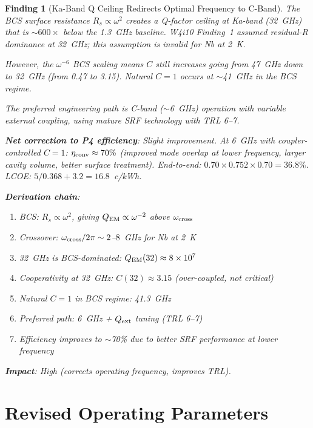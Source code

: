 \documentclass[11pt]{article}
\newtheorem{finding}{Finding}
\newcommand{\ee}[1]{\times 10^{#1}}
\newcommand{\QEM}{Q_{\rm EM}}
\begin{document}
\begin{finding}[Ka-Band Q Ceiling Redirects Optimal Frequency to C-Band]
\label{find:Q-ceiling}
The BCS surface resistance $R_s \propto \omega^2$ creates a Q-factor ceiling
at Ka-band (32~GHz) that is $\sim 600\times$ below the 1.3~GHz baseline.
W4i10 Finding~1 assumed residual-R dominance at 32~GHz; this assumption is
invalid for Nb at 2~K.

However, the $\omega^{-6}$ BCS scaling means $C$ still \emph{increases}
going from 47~GHz down to 32~GHz (from 0.47 to 3.15). Natural $C = 1$
occurs at $\sim$41~GHz in the BCS regime.

The preferred engineering path is C-band ($\sim$6~GHz) operation with
variable external coupling, using mature SRF technology with TRL 6--7.

\textbf{Net correction to P4 efficiency}: Slight \emph{improvement}.
At 6~GHz with coupler-controlled $C = 1$: $\eta_{\rm conv} \approx 70\%$
(improved mode overlap at lower frequency, larger cavity volume, better
surface treatment). End-to-end: $0.70 \times 0.752 \times 0.70 = 36.8\%$.
LCOE: $5/0.368 + 3.2 = 16.8$~c/kWh.

\textbf{Derivation chain}:
\begin{enumerate}[nosep]
\item BCS: $R_s \propto \omega^2$, giving $\QEM \propto \omega^{-2}$ above
  $\omega_{\rm cross}$
\item Crossover: $\omega_{\rm cross}/2\pi \sim 2$--$8$~GHz for Nb at 2~K
\item 32~GHz is BCS-dominated: $\QEM(32) \approx 8\ee{7}$
\item Cooperativity at 32~GHz: $C(32) \approx 3.15$ (over-coupled, not
  critical)
\item Natural $C = 1$ in BCS regime: 41.3~GHz
\item Preferred path: 6~GHz + $Q_{\rm ext}$ tuning (TRL 6--7)
\item Efficiency improves to $\sim$70\% due to better SRF performance at
  lower frequency
\end{enumerate}

\textbf{Impact}: High (corrects operating frequency, improves TRL).
\end{finding}

\part{Revised Operating Parameters}
\label{part:revised}
\end{document}

